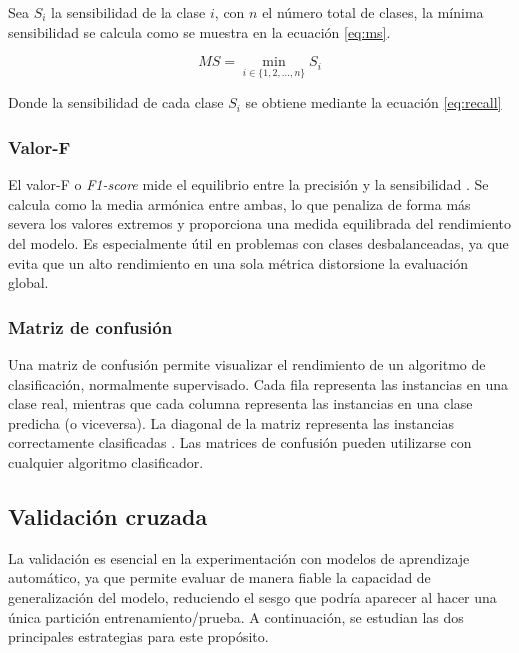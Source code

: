 \vspace{1em}

Sea \( S_i \) la sensibilidad de la clase \( i \), con \( n \) el número total de clases, la mínima sensibilidad se calcula como se muestra en la ecuación \ref{eq:ms}.

\begin{equation}
	MS = \min_{i \in \{1, 2, \dots, n\}} S_i
	\label{eq:ms}
\end{equation}

Donde la sensibilidad de cada clase \( S_i \) se obtiene mediante la ecuación \ref{eq:recall}

\newpage
\subsubsection{Valor-F}
\label{subsubsec:f1}

El valor-F o \textit{F1-score} mide el equilibrio entre la precisión y la sensibilidad \cite{metrics}. Se calcula como la media armónica entre ambas, lo que penaliza de forma más severa los valores extremos y proporciona una medida equilibrada del rendimiento del modelo. Es especialmente útil en problemas con clases desbalanceadas, ya que evita que un alto rendimiento en una sola métrica distorsione la evaluación global.

\subsubsection{Matriz de confusión}
\label{subsubsec:matrix}

Una matriz de confusión permite visualizar el rendimiento de un algoritmo de clasificación, normalmente supervisado. Cada fila representa las instancias en una clase real, mientras que cada columna representa las instancias en una clase predicha (o viceversa). La diagonal de la matriz representa las instancias correctamente clasificadas \cite{confmat}. Las matrices de confusión pueden utilizarse con cualquier algoritmo clasificador.

\subsection{Validación cruzada}
\label{subsec:validacion}

La validación es esencial en la experimentación con modelos de aprendizaje automático, ya que permite evaluar de manera fiable la capacidad de generalización del modelo, reduciendo el sesgo que podría aparecer al hacer una única partición entrenamiento/prueba. A continuación, se estudian las dos principales estrategias para este propósito.

